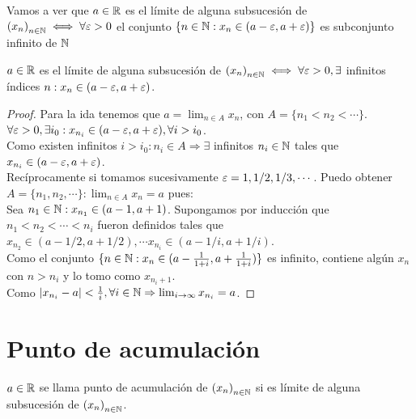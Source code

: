 Vamos a ver que \(a \in \mathbb{R} \) es el límite de alguna subsucesión de \({(x_n)}_{n \in \mathbb{N}} \iff \forall \varepsilon > 0\) el conjunto \( \{ n \in \mathbb{N} : x_n \in (a - \varepsilon, a + \varepsilon) \} \) es subconjunto infinito de \(\mathbb{N} \)
\begin{theorem}
  \(a \in \mathbb{R} \) es el límite de alguna subsucesión de \({(x_n)}_{n \in \mathbb{N}} \iff \forall \varepsilon > 0, \exists \) infinitos índices \(n : x_n \in (a-\varepsilon, a+\varepsilon)\).
  \begin{proof}
    Para la ida tenemos que \(a = \lim_{n \in A} x_n\), con \(A = \{ n_1 < n_2 < \cdots \} \). \\
    \(\forall \varepsilon > 0, \exists i_0 : x_{n_i} \in (a - \varepsilon, a + \varepsilon), \forall i > i_0\). \\
    Como existen infinitos \(i > i_0 : n_i \in A \Rightarrow \exists \) infinitos \(n_i \in \mathbb{N} \) tales que \(x_{n_i} \in (a - \varepsilon, a + \varepsilon)\). \\

    Recíprocamente si tomamos sucesivamente \(\varepsilon = 1, 1/2, 1/3, \cdots \). Puedo obtener \(A = \{ n_1, n_2, \cdots \} : \lim_{n \in A} x_n = a\) pues: \\
    Sea \(n_1 \in \mathbb{N} : x_{n_1} \in (a-1, a+1)\). Supongamos por inducción que \(n_1 < n_2 < \cdots < n_i\) fueron definidos tales que \(x_{n_2} \in (a - 1/2, a + 1/2), \cdots x_{n_i} \in (a - 1/i, a + 1/i)\). \\
    Como el conjunto \(\{ n \in \mathbb{N} : x_n \in (a - \frac{1}{1+i}, a + \frac{1}{1+i}) \} \) es infinito, contiene algún \(x_n\) con \(n > n_i\) y lo tomo como \(x_{n_i + 1} \). \\
    Como \(| x_{n_i} - a | < \frac{1}{i}, \forall i \in \mathbb{N} \Rightarrow \lim_{i \to \infty} x_{n_i} = a\).
  \end{proof}
\end{theorem}

\section{Punto de acumulación}

\begin{definition}
  \(a \in \mathbb{R} \) se llama punto de acumulación de \({(x_n)}_{n \in \mathbb{N}} \) si es límite de alguna subsucesión de \({(x_n)}_{n \in \mathbb{N}} \).
\end{definition}

